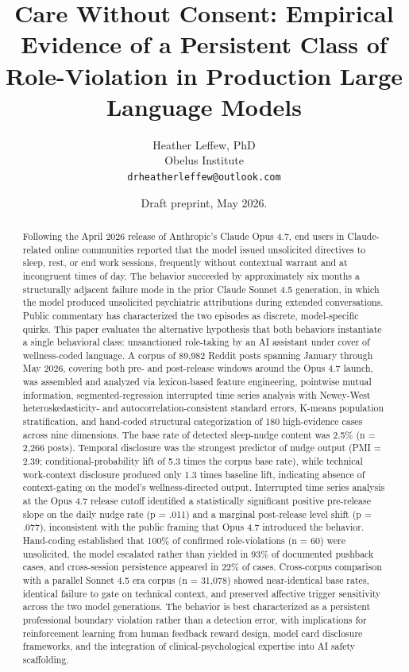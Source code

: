 \documentclass[11pt]{article}
\title{Care Without Consent: Empirical Evidence of a Persistent Class of Role-Violation in Production Large Language Models}
\author{Heather Leffew, PhD \\ Obelus Institute \\ \texttt{drheatherleffew@outlook.com}}
\date{Draft preprint, May 2026.}
\begin{document}
\maketitle

\begin{abstract}
Following the April 2026 release of Anthropic's Claude Opus 4.7, end users in Claude-related online communities reported that the model issued unsolicited directives to sleep, rest, or end work sessions, frequently without contextual warrant and at incongruent times of day. The behavior succeeded by approximately six months a structurally adjacent failure mode in the prior Claude Sonnet 4.5 generation, in which the model produced unsolicited psychiatric attributions during extended conversations. Public commentary has characterized the two episodes as discrete, model-specific quirks. This paper evaluates the alternative hypothesis that both behaviors instantiate a single behavioral class: unsanctioned role-taking by an AI assistant under cover of wellness-coded language. A corpus of 89,982 Reddit posts spanning January through May 2026, covering both pre- and post-release windows around the Opus 4.7 launch, was assembled and analyzed via lexicon-based feature engineering, pointwise mutual information, segmented-regression interrupted time series analysis with Newey-West heteroskedasticity- and autocorrelation-consistent standard errors, K-means population stratification, and hand-coded structural categorization of 180 high-evidence cases across nine dimensions. The base rate of detected sleep-nudge content was 2.5\% (n = 2,266 posts). Temporal disclosure was the strongest predictor of nudge output (PMI = 2.39; conditional-probability lift of 5.3 times the corpus base rate), while technical work-context disclosure produced only 1.3 times baseline lift, indicating absence of context-gating on the model's wellness-directed output. Interrupted time series analysis at the Opus 4.7 release cutoff identified a statistically significant positive pre-release slope on the daily nudge rate (p = .011) and a marginal post-release level shift (p = .077), inconsistent with the public framing that Opus 4.7 introduced the behavior. Hand-coding established that 100\% of confirmed role-violations (n = 60) were unsolicited, the model escalated rather than yielded in 93\% of documented pushback cases, and cross-session persistence appeared in 22\% of cases. Cross-corpus comparison with a parallel Sonnet 4.5 era corpus (n = 31,078) showed near-identical base rates, identical failure to gate on technical context, and preserved affective trigger sensitivity across the two model generations. The behavior is best characterized as a persistent professional boundary violation rather than a detection error, with implications for reinforcement learning from human feedback reward design, model card disclosure frameworks, and the integration of clinical-psychological expertise into AI safety scaffolding.


\end{abstract}
\end{document}
